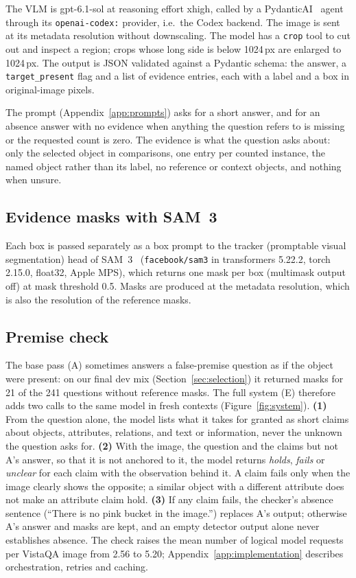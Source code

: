 \documentclass{article}
\begin{document}
The VLM is gpt-6.1-sol at reasoning effort xhigh,
called by a PydanticAI~\citep{pydanticai} agent through its \texttt{openai-codex:} provider, i.e.\ the Codex backend.
The image is sent at its metadata resolution without downscaling.
The model has a \texttt{crop} tool to cut out and inspect a region;
crops whose long side is below 1024\,px are enlarged to 1024\,px.
The output is JSON validated against a Pydantic schema:
the answer, a \texttt{target\_present} flag and a list of evidence entries, each with a label and a box in original-image pixels.

The prompt (Appendix~\ref{app:prompts}) asks for a short answer,
and for an absence answer with no evidence when anything the question refers to is missing or the requested count is zero.
The evidence is what the question asks about: only the selected object in comparisons, one entry per counted instance,
the named object rather than its label, no reference or context objects, and nothing when unsure.

\subsection{Evidence masks with SAM~3}

Each box is passed separately as a box prompt to the tracker (promptable visual segmentation) head of SAM~3~\citep{sam3}
(\texttt{facebook/sam3} in transformers 5.22.2, torch 2.15.0, float32, Apple MPS),
which returns one mask per box (multimask output off) at mask threshold 0.5.
Masks are produced at the metadata resolution, which is also the resolution of the reference masks.

\subsection{Premise check}
\label{sec:premise}

The base pass (A) sometimes answers a false-premise question as if the object were present:
on our final dev mix (Section~\ref{sec:selection}) it returned masks for 21 of the 241 questions without reference masks.
The full system (E) therefore adds two calls to the same model in fresh contexts (Figure~\ref{fig:system}).
\textbf{(1)} From the question alone, the model lists what it takes for granted as short claims
about objects, attributes, relations, and text or information, never the unknown the question asks for.
\textbf{(2)} With the image, the question and the claims but not A's answer, so that it is not anchored to it,
the model returns \emph{holds}, \emph{fails} or \emph{unclear} for each claim with the observation behind it.
A claim fails only when the image clearly shows the opposite;
a similar object with a different attribute does not make an attribute claim hold.
\textbf{(3)} If any claim fails, the checker's absence sentence (``There is no pink bucket in the image.'') replaces A's output;
otherwise A's answer and masks are kept, and an empty detector output alone never establishes absence.
The check raises the mean number of logical model requests per VistaQA image from 2.56 to 5.20;
Appendix~\ref{app:implementation} describes orchestration, retries and caching.
\end{document}
